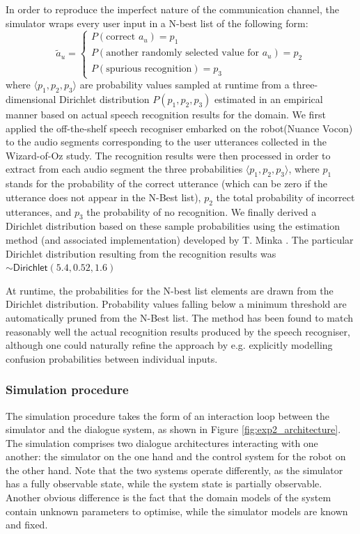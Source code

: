 In order to reproduce the imperfect nature of the communication channel, the simulator wraps every user input in a N-best list of the following form: 
\begin{equation}
\tilde{a}_u = \begin{cases} P(\text{correct } a_u) = p_1 \\ P(\text{another randomly selected value for } a_u) = p_2 \\ P(\text{spurious recognition}) = p_3 \end{cases} \nonumber
\end{equation}
where $\langle p_1, p_2, p_3 \rangle$ are probability values sampled at runtime from a three-dimensional Dirichlet distribution $P(p_1, p_2, p_3)$ estimated in an empirical manner based on actual speech recognition results for the domain. We first applied the off-the-shelf speech recogniser embarked on the robot(Nuance Vocon) to the audio segments corresponding to the user utterances collected in the Wizard-of-Oz study.  The recognition results were then processed in order to extract from each audio segment the three probabilities $\langle p_1, p_2, p_3 \rangle$, where $p_1$ stands for the probability of the correct utterance (which can be zero if the utterance does not appear in the N-Best list), $p_2$ the total probability of incorrect utterances, and $p_3$ the probability of no recognition. We finally derived a Dirichlet distribution based on these sample probabilities using the estimation method (and associated implementation) developed by T. Minka \citep{minka2003}.  The particular Dirichlet distribution resulting from the recognition results was $\sim\mathsf{Dirichlet}(5.4, 0.52, 1.6)$

At runtime, the probabilities for the N-best list elements are drawn from the Dirichlet distribution. Probability values falling below a minimum threshold are automatically pruned from the N-Best list. The method has been found to match reasonably well the actual recognition results produced by the speech recogniser, although one could naturally refine the approach by e.g. explicitly modelling confusion probabilities between individual inputs. 

\subsubsection*{Simulation procedure}

The simulation procedure takes the form of an interaction loop between the simulator and the dialogue system, as shown in Figure \ref{fig:exp2_architecture}.  The simulation comprises two dialogue architectures interacting with one another: the simulator on the one hand and the control system for the robot on the other hand.  Note that the two systems operate differently, as the simulator has a fully observable state, while the system state is partially observable.  Another obvious difference is the fact that the domain models of the system contain unknown parameters to optimise, while the simulator models are known and fixed. 

